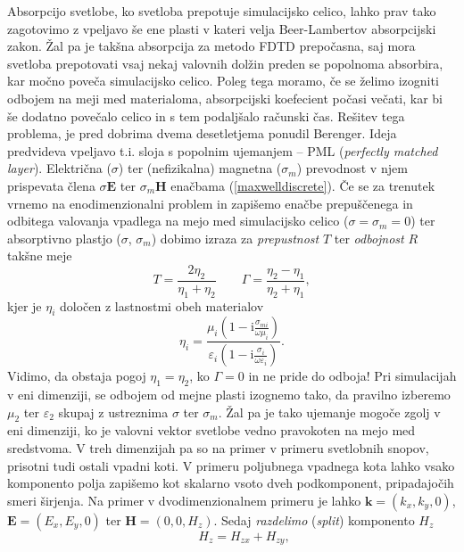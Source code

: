\documentclass[longbibliography,slovene,a4paper,12pt]{book}
\newcommand{\I}{\text{i}}
\begin{document}
Absorpcijo svetlobe, ko svetloba prepotuje simulacijsko celico, lahko prav tako zagotovimo z vpeljavo še ene plasti v kateri velja Beer-Lambertov absorpcijski zakon\cite{beerlambert}. Žal pa je takšna absorpcija za metodo FDTD prepočasna, saj mora svetloba prepotovati vsaj nekaj valovnih dolžin preden se popolnoma absorbira, kar močno poveča simulacijsko celico. Poleg tega moramo, če se želimo izogniti odbojem na meji med materialoma, absorpcijski koefecient počasi večati, kar bi še dodatno povečalo celico in s tem podaljšalo računski čas. Rešitev tega problema, je pred dobrima dvema desetletjema ponudil Berenger\cite{berenger}. Ideja predvideva vpeljavo t.i. sloja s popolnim ujemanjem -- PML (\emph{perfectly matched layer}). Električna ($\sigma$) ter (nefizikalna) magnetna ($\sigma_m$) prevodnost v njem prispevata člena $\sigma \mathbf{E}$ ter $\sigma_m \mathbf{H}$ enačbama (\ref{maxwelldiscrete}). Če se za trenutek vrnemo na enodimenzionalni problem in zapišemo enačbe prepuščenega in odbitega valovanja vpadlega na mejo med simulacijsko celico ($\sigma = \sigma_m = 0$) ter absorptivno plastjo ($\sigma$, $\sigma_m$) dobimo izraza za \emph{prepustnost} $T$ ter \emph{odbojnost} $R$ takšne meje
\begin{equation}
T = \frac{2\eta_2}{\eta_1+ \eta_2} \qquad \Gamma = \frac{\eta_2 - \eta_1}{\eta_2 + \eta_1},
\end{equation}
kjer je $\eta_i$ določen z lastnostmi obeh materialov
\begin{equation}
\eta_i = \frac{\mu_i \left (1-\I\frac{\sigma_{mi}}{\omega \mu_i}\right )}{\varepsilon_i \left (1-\I \frac{\sigma_i}{\omega \varepsilon_i} \right )}.
\end{equation}
Vidimo, da obstaja pogoj $\eta_1 = \eta_2$, ko $\Gamma = 0$ in ne pride do odboja! Pri simulacijah v eni dimenziji, se odbojem od mejne plasti izognemo tako, da pravilno izberemo $\mu_2$ ter $\varepsilon_2$ skupaj z ustreznima $\sigma$ ter $\sigma_m$. Žal pa je tako ujemanje mogoče zgolj v eni dimenziji, ko je valovni vektor svetlobe vedno pravokoten na mejo med sredstvoma. V treh dimenzijah pa so na primer v primeru svetlobnih snopov, prisotni tudi ostali vpadni koti. V primeru poljubnega vpadnega kota lahko vsako komponento polja zapišemo kot skalarno vsoto dveh podkomponent, pripadajočih smeri širjenja. Na primer v dvodimenzionalnem primeru je lahko $\mathbf{k} = (k_x, k_y, 0)$, $\mathbf{E} = (E_x, E_y, 0)$ ter $\mathbf{H} = (0,0,H_z)$. Sedaj \emph{razdelimo} (\emph{split}) komponento $H_z$ 
\begin{equation}
\qquad H_z = H_{zx} + H_{zy},
\end{equation}
\end{document}
